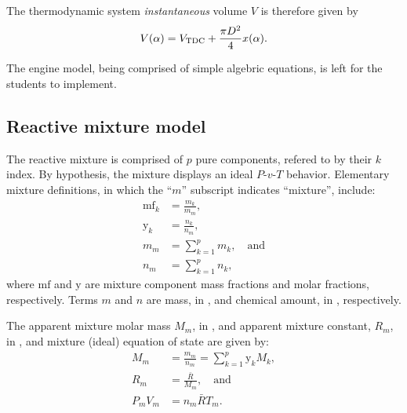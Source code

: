     The thermodynamic system \emph{instantaneous} volume $V$ is therefore given by%
    \begin{equation}
        \label{eq:V}
        V(\alpha) = V_{\mbox{\scriptsize TDC}} + \frac{\pi D^2}{4}x(\alpha).
    \end{equation}

    The engine model, being comprised of simple algebric equations, is left for the students to implement.


    \subsection{Reactive mixture model}\label{sec:model.reactm}

    The reactive mixture is comprised of $p$ pure components, refered to by their $k$ index. By hypothesis, the mixture displays
    an ideal $P$-$v$-$T$ behavior. Elementary mixture  definitions,  in  which  the  ``$m$''  subscript  indicates  ``mixture'',
    include:%
    \begin{align}
        \label{eq:mf}
        \mathrm{mf}_k   &= \frac{m_k}{m_m}, \\
        \label{eq:y}
        \mathrm{y}_k    &= \frac{n_k}{n_m}, \\
        \label{eq:mm}
        m_m             &= \sum_{k=1}^p m_k, \quad\mbox{and} \\
        \label{eq:nm}
        n_m             &= \sum_{k=1}^p n_k,
    \end{align}
    \noindent where $\mathrm{mf}$ and $\mathrm{y}$ are mixture component mass fractions and molar fractions, respectively. Terms
    $m$ and $n$ are mass, in \kilogram, and chemical amount, in \kilo\mole, respectively.

    The  apparent  mixture  molar  mass  $M_m$,  in  \kilogram\per\kilo\mole,  and  apparent   mixture   constant,   $R_m$,   in
    \kilo\joule\per\kilogram\usk\kelvin, and mixture (ideal) equation of state are given by:%
    \begin{align}
        \label{eq:Mm}
        M_m         &= \frac{m_m}{n_m} = \sum_{k=1}^p \mathrm{y}_k M_k, \\
        \label{eq:Rm}
        R_m         &= \frac{\bar{R}}{M_m}, \quad\mbox{and} \\
        \label{eq:mEoS}
        P_mV_m      &= n_m\bar{R}T_m.
    \end{align}

